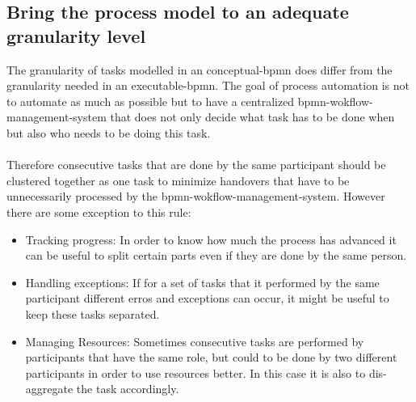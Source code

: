 \subsection{Bring the process model to an adequate granularity level}
The granularity of tasks modelled in an \gls{conceptual-bpmn} does differ from the granularity needed in an \gls{executable-bpmn}.
The goal of process automation is not to automate as much as possible but to have a centralized \gls{bpmn-wokflow-management-system} that does not only decide what task has to be done when but also who needs to be doing this task. \cite{freund2019real}
\\~\\Therefore consecutive tasks that are done by the same participant should be clustered together as one task to minimize handovers that have to be unnecessarily processed by the \gls{bpmn-wokflow-management-system}. \cite{fundamentals}
However there are some exception to this rule:
\begin{itemize}
	\item Tracking progress: In order to know how much the process has advanced it can be useful to split certain parts even if they are done by the same person. 
	\item Handling exceptions: If for a set of tasks that it performed by the same participant different erros and exceptions can occur, it might be useful to keep these tasks separated.
	\item Managing Resources: Sometimes consecutive tasks are performed by participants that have the same role, but could to be done by two different participants in order to use resources better. In this case it is also  to dis-aggregate the task accordingly.
 \end{itemize}


